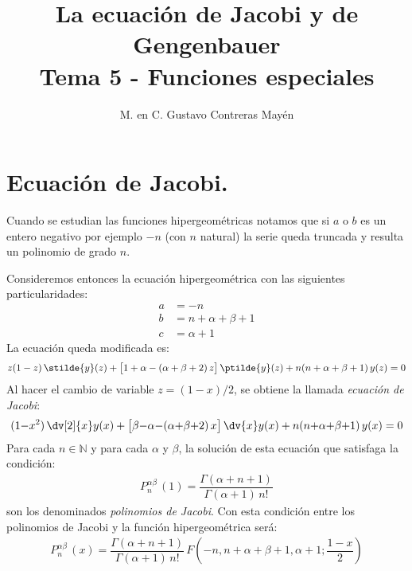 
\usepackage{apacite}
\title{La ecuación de Jacobi y de Gengenbauer \\ \large {Tema 5 - Funciones especiales} \vspace{-3ex}}
\author{M. en C. Gustavo Contreras Mayén}
\date{ }

\vspace{-4cm}
\maketitle
\fontsize{14}{14}\selectfont
\tableofcontents
\newpage
\section{Ecuación de Jacobi.}

Cuando se estudian las funciones hipergeométricas notamos que si $a$ o $b$ es un entero negativo por ejemplo $-n$ (con $n$ natural) la serie queda truncada y resulta un polinomio de grado $n$.
\par
Consideremos entonces la ecuación hipergeométrica con las siguientes particularidades:
\begin{align*}
a &= -n \\[0.5em]
b &= n + \alpha + \beta + 1 \\[0.5em]
c &= \alpha + 1
\end{align*}
La ecuación queda modificada es:
\begin{align*}
z (1 - z) \, \stilde{y} (z) + \big[ 1 + \alpha - (\alpha + \beta + 2) \, z \big] \, \ptilde{y} (z) + n(n + \alpha + \beta + 1) \, y(z) = 0
\end{align*}
Al hacer el cambio de variable $z = (1 - x)/2$, se obtiene la llamada \emph{ecuación de Jacobi}:
\begin{align*}
(1 {-} x^{2}) \, \dv[2]{x} y(x) + \big[ \beta {-} \alpha {-} (\alpha {+} \beta {+} 2) \, x \big] \, \dv{x} y(x) + n(n {+} \alpha {+} \beta {+} 1) \, y(x) = 0
\end{align*}
Para cada $n \in \mathbb{N}$ y para cada $\alpha$ y $\beta$, la solución de esta ecuación que satisfaga la condición:
\begin{align*}
P_{n}^{\alpha \beta} \, (1) = \dfrac{\Gamma (\alpha + n + 1)}{\Gamma (\alpha + 1) \, n!}
\end{align*}
son los denominados \emph{polinomios de Jacobi}. Con esta condición entre los polinomios de Jacobi y la función hipergeométrica será:
\begin{align*}
P_{n}^{\alpha \beta} \, (x) = \dfrac{\Gamma (\alpha + n + 1)}{\Gamma (\alpha + 1) \, n!} \, F \left( -n, n + \alpha + \beta + 1, \alpha + 1; \dfrac{1 - x}{2} \right)
\end{align*}

